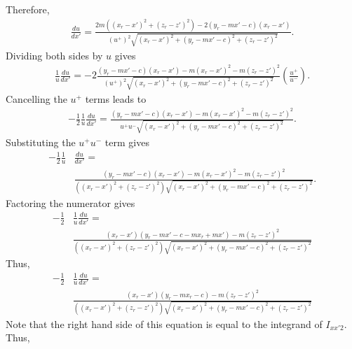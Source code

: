 Therefore,
\begin{align}
    \frac{du}{dx'} = \frac{2m\left(\left(x_r-x'\right)^2+\left(z_r-z'\right)^2\right)-2\left(y_r-mx'-c\right)\left(x_r-x'\right)}{\left(u^+\right)^2\sqrt{\left(x_r-x'\right)^2+\left(y_r-mx'-c\right)^2+\left(z_r-z'\right)^2}} \text{.}
\end{align}
Dividing both sides by \(u\) gives
\begin{align}
    \frac{1}{u}\frac{du}{dx'} = -2\frac{\left(y_r-mx'-c\right)\left(x_r-x'\right)-m\left(x_r-x'\right)^2-m\left(z_r-z'\right)^2}{\left(u^+\right)^2\sqrt{\left(x_r-x'\right)^2+\left(y_r-mx'-c\right)^2+\left(z_r-z'\right)^2}} \left(\frac{u^+}{u^-}\right) \text{.}
\end{align}
Cancelling the \(u^+\) terms leads to
\begin{align}
    -\frac{1}{2}\frac{1}{u}\frac{du}{dx'} = \frac{\left(y_r-mx'-c\right)\left(x_r-x'\right) - m\left(x_r-x'\right)^2 - m\left(z_r-z'\right)^2}{u^+u^-\sqrt{\left(x_r-x'\right)^2+\left(y_r-mx'-c\right)^2+\left(z_r-z'\right)^2}} \text{.}
\end{align}
Substituting the \(u^+u^-\) term gives
\begin{align}
    -\frac{1}{2}\frac{1}{u}&\frac{du}{dx'} = \nonumber \\
    &\frac{\left(y_r-mx'-c\right)\left(x_r-x'\right) - m\left(x_r-x'\right)^2 - m\left(z_r-z'\right)^2}{\left(\left(x_r-x'\right)^2+\left(z_r-z'\right)^2\right)\sqrt{\left(x_r-x'\right)^2+\left(y_r-mx'-c\right)^2+\left(z_r-z'\right)^2}} \text{.}
\end{align}
Factoring the numerator gives
\begin{align}
    -\frac{1}{2}&\frac{1}{u}\frac{du}{dx'} = \nonumber \\
    &\frac{\left(x_r-x'\right)\left(y_r-mx'-c-mx_r+mx'\right) - m\left(z_r-z'\right)^2}{\left(\left(x_r-x'\right)^2+\left(z_r-z'\right)^2\right)\sqrt{\left(x_r-x'\right)^2+\left(y_r-mx'-c\right)^2+\left(z_r-z'\right)^2}} \nonumber
\end{align}
Thus,
\begin{align}
    -\frac{1}{2}&\frac{1}{u}\frac{du}{dx'} = \nonumber \\
    &\frac{\left(x_r-x'\right)\left(y_r-mx_r-c\right) - m\left(z_r-z'\right)^2}{\left(\left(x_r-x'\right)^2+\left(z_r-z'\right)^2\right)\sqrt{\left(x_r-x'\right)^2+\left(y_r-mx'-c\right)^2+\left(z_r-z'\right)^2}}
\end{align}
Note that the right hand side of this equation is equal to the integrand of \(I_{xx'2}\). Thus,
